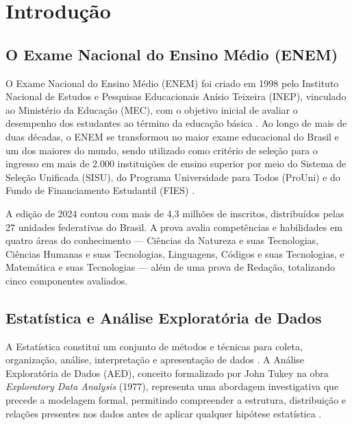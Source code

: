 \documentclass[
    12pt,
    oneside,
    a4paper,
    chapter=TITLE,
    section=TITLE
]{abntex2}
\begin{document}
\tableofcontents*
\listoffigures*
\listoftables*

\cleardoublepage
\pagestyle{fancy}
\textual

\chapter{Introdução}

\section{O Exame Nacional do Ensino Médio (ENEM)}

O Exame Nacional do Ensino Médio (ENEM) foi criado em 1998 pelo Instituto Nacional de Estudos e
Pesquisas Educacionais Anísio Teixeira (INEP), vinculado ao Ministério da Educação (MEC), com o
objetivo inicial de avaliar o desempenho dos estudantes ao término da educação básica
\cite{inep2024}. Ao longo de mais de duas décadas, o ENEM se transformou no maior exame educacional
do Brasil e um dos maiores do mundo, sendo utilizado como critério de seleção para o ingresso em
mais de 2.000 instituições de ensino superior por meio do Sistema de Seleção Unificada (SISU),
do Programa Universidade para Todos (ProUni) e do Fundo de Financiamento Estudantil (FIES)
\cite{brasil2009}.

A edição de 2024 contou com mais de 4,3 milhões de inscritos, distribuídos pelas 27 unidades
federativas do Brasil. A prova avalia competências e habilidades em quatro áreas do conhecimento
— Ciências da Natureza e suas Tecnologias, Ciências Humanas e suas Tecnologias, Linguagens,
Códigos e suas Tecnologias, e Matemática e suas Tecnologias — além de uma prova de Redação,
totalizando cinco componentes avaliados.

\section{Estatística e Análise Exploratória de Dados}

A Estatística constitui um conjunto de métodos e técnicas para coleta, organização, análise,
interpretação e apresentação de dados \cite{bussab2017}. A Análise Exploratória de Dados (AED),
conceito formalizado por John Tukey na obra \textit{Exploratory Data Analysis} (1977), representa
uma abordagem investigativa que precede a modelagem formal, permitindo compreender a estrutura,
distribuição e relações presentes nos dados antes de aplicar qualquer hipótese estatística
\cite{tukey1977}.
\end{document}
